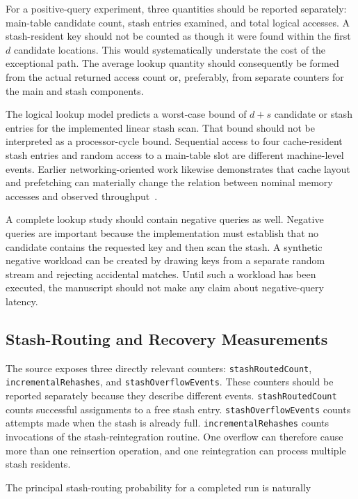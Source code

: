 \documentclass[conference]{IEEEtran}
\begin{document}
For a positive-query experiment, three quantities should be reported separately:
main-table candidate count, stash entries examined, and total logical accesses.
A stash-resident key should not be counted as though it were found within the
first $d$ candidate locations. This would systematically understate the cost of
the exceptional path. The average lookup quantity should consequently be formed
from the actual returned access count or, preferably, from separate counters
for the main and stash components.

The logical lookup model predicts a worst-case bound of $d+s$ candidate or
stash entries for the implemented linear stash scan. That bound should not be
interpreted as a processor-cycle bound. Sequential access to four cache-resident
stash entries and random access to a main-table slot are different machine-level
events. Earlier networking-oriented work likewise demonstrates that cache
layout and prefetching can materially change the relation between nominal memory
accesses and observed throughput~\cite{lescouarnec2018cuckoopp}.

A complete lookup study should contain negative queries as well. Negative
queries are important because the implementation must establish that no
candidate contains the requested key and then scan the stash. A synthetic
negative workload can be created by drawing keys from a separate random stream
and rejecting accidental matches. Until such a workload has been executed, the
manuscript should not make any claim about negative-query latency.

\subsection{Stash-Routing and Recovery Measurements}

The source exposes three directly relevant counters: \texttt{stashRoutedCount},
\texttt{incrementalRehashes}, and \texttt{stashOverflowEvents}. These counters
should be reported separately because they describe different events.
\texttt{stashRoutedCount} counts successful assignments to a free stash entry.
\texttt{stashOverflowEvents} counts attempts made when the stash is already full.
\texttt{incrementalRehashes} counts invocations of the stash-reintegration
routine. One overflow can therefore cause more than one reinsertion operation,
and one reintegration can process multiple stash residents.

The principal stash-routing probability for a completed run is naturally
\end{document}
